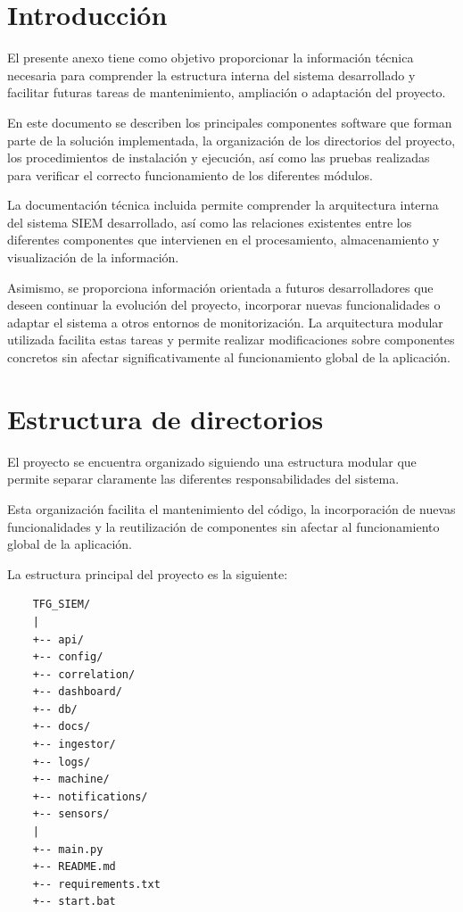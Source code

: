 
\section{Introducción}

El presente anexo tiene como objetivo proporcionar la información técnica necesaria para comprender la estructura interna del sistema desarrollado y facilitar futuras tareas de mantenimiento, ampliación o adaptación del proyecto.

En este documento se describen los principales componentes software que forman parte de la solución implementada, la organización de los directorios del proyecto, los procedimientos de instalación y ejecución, así como las pruebas realizadas para verificar el correcto funcionamiento de los diferentes módulos.

La documentación técnica incluida permite comprender la arquitectura interna del sistema SIEM desarrollado, así como las relaciones existentes entre los diferentes componentes que intervienen en el procesamiento, almacenamiento y visualización de la información.

Asimismo, se proporciona información orientada a futuros desarrolladores que deseen continuar la evolución del proyecto, incorporar nuevas funcionalidades o adaptar el sistema a otros entornos de monitorización. La arquitectura modular utilizada facilita estas tareas y permite realizar modificaciones sobre componentes concretos sin afectar significativamente al funcionamiento global de la aplicación.

\section{Estructura de directorios}

El proyecto se encuentra organizado siguiendo una estructura modular que permite separar claramente las diferentes responsabilidades del sistema.

Esta organización facilita el mantenimiento del código, la incorporación de nuevas funcionalidades y la reutilización de componentes sin afectar al funcionamiento global de la aplicación.

La estructura principal del proyecto es la siguiente:
\begin{verbatim}
	TFG_SIEM/
	|
	+-- api/
	+-- config/
	+-- correlation/
	+-- dashboard/
	+-- db/
	+-- docs/
	+-- ingestor/
	+-- logs/
	+-- machine/
	+-- notifications/
	+-- sensors/
	|
	+-- main.py
	+-- README.md
	+-- requirements.txt
	+-- start.bat
\end{verbatim}

